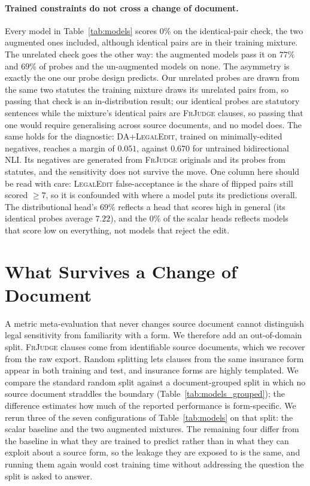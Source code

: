 \documentclass[11pt]{article}
\begin{document}
\paragraph{Trained constraints do not cross a change of document.}
Every model in Table~\ref{tab:models} scores $0\%$ on the identical-pair check,
the two augmented ones included, although identical pairs are in their training
mixture. The unrelated check goes the other way: the augmented models pass it on
$77\%$ and $69\%$ of probes and the un-augmented models on none. The asymmetry
is exactly the one our probe design predicts. Our unrelated probes are drawn
from the same two statutes the training mixture draws its unrelated pairs from,
so passing that check is an in-distribution result; our identical probes are
statutory sentences while the mixture's identical pairs are \textsc{FrJudge}
clauses, so passing that one would require generalising across source documents,
and no model does. The same holds for the diagnostic: \textsc{DA+LegalEdit},
trained on minimally-edited negatives, reaches a margin of $0.051$, against
$0.670$ for untrained bidirectional NLI. Its negatives are generated from
\textsc{FrJudge} originals and its probes from statutes, and the sensitivity
does not survive the move. One column here should be read with care:
\textsc{LegalEdit} false-acceptance is the share of flipped pairs still scored
$\geq 7$, so it is confounded with where a model puts its predictions overall.
The distributional head's $69\%$ reflects a head that scores high in general
(its identical probes average $7.22$), and the $0\%$ of the scalar heads
reflects models that score low on everything, not models that reject the edit.

\section{What Survives a Change of Document}
\label{sec:general}

A metric meta-evaluation that never changes source document cannot distinguish
legal sensitivity from familiarity with a form. We therefore add an
out-of-domain split. \textsc{FrJudge} clauses come from identifiable source
documents, which we recover from the raw export. Random splitting lets clauses
from the same insurance form appear in both training and test, and insurance
forms are highly templated. We compare the standard random split against a
document-grouped split in which no source document straddles the boundary
(Table~\ref{tab:models_grouped}); the difference estimates how much of the
reported performance is form-specific. We rerun three of the seven
configurations of Table~\ref{tab:models} on that split: the scalar baseline and
the two augmented mixtures. The remaining four differ from the baseline in what
they are trained to predict rather than in what they can exploit about a source
form, so the leakage they are exposed to is the same, and running them again
would cost training time without addressing the question the split is asked to
answer.
\end{document}
